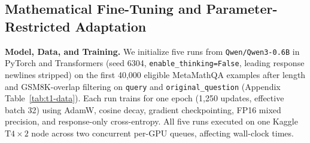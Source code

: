 \documentclass{article}
\begin{document}
\subsection{Mathematical Fine-Tuning and Parameter-Restricted Adaptation}
\label{sec:setup-finetuning}

\textbf{Model, Data, and Training.} We initialize five runs from \texttt{Qwen/Qwen3-0.6B} \citep{qwen3} in PyTorch and Transformers \citep{paszke2019pytorch, wolf2020transformers} (seed 6304, \texttt{enable\_\allowbreak thinking=\allowbreak False}, leading response newlines stripped) on the first 40,000 eligible MetaMathQA \citep{yu2024metamath} examples after length and GSM8K-overlap filtering on \texttt{query} and \texttt{original\_\allowbreak question} (Appendix Table~\ref{tab:t1-data}). Each run trains for one epoch (1,250 updates, effective batch 32) using AdamW, cosine decay, gradient checkpointing, FP16 mixed precision, and response-only cross-entropy. All five runs executed on one Kaggle $\text{T4}\times 2$ node across two concurrent per-GPU queues, affecting wall-clock times.
\end{document}
